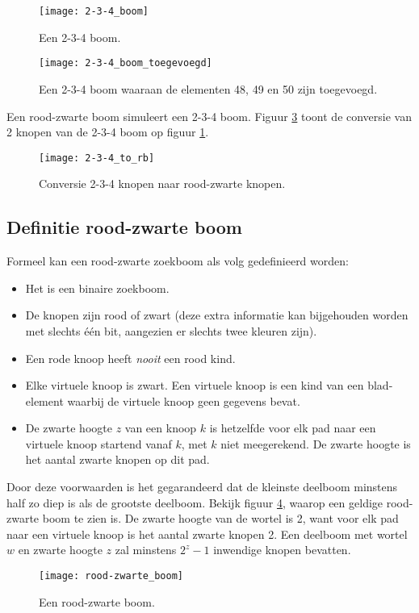 \documentclass{report}
\begin{document}
	\begin{figure}[h]
		\centering
		\texttt{[image: 2-3-4\_boom]}
		\caption{Een 2-3-4 boom.}
		\label{fig:2-3-4_boom}
	\end{figure}

	\begin{figure}[h]
		\centering
		\texttt{[image: 2-3-4\_boom\_toegevoegd]}
		\caption{Een 2-3-4 boom waaraan de elementen 48, 49 en 50 zijn toegevoegd.}
		\label{fig:2-3-4_boom_toegevoegd}
	\end{figure}

	Een rood-zwarte boom simuleert een 2-3-4 boom. Figuur \ref{fig:2-3-4_to_rb} toont de conversie van 2 knopen van de 2-3-4 boom op figuur \ref{fig:2-3-4_boom}.
	\begin{figure}[h]
		\centering
		\texttt{[image: 2-3-4\_to\_rb]}
		\caption{Conversie 2-3-4 knopen naar rood-zwarte knopen.}
		\label{fig:2-3-4_to_rb}
	\end{figure}
	
	\subsection{Definitie rood-zwarte boom}
	Formeel kan een rood-zwarte zoekboom als volg gedefinieerd worden:
	\begin{itemize}
		\item Het is een binaire zoekboom.
		\item De knopen zijn rood of zwart (deze extra informatie kan bijgehouden worden met slechts één bit, aangezien er slechts twee kleuren zijn).
		\item Een rode knoop heeft \textit{nooit} een rood kind.
		\item Elke virtuele knoop is zwart. Een virtuele knoop is een kind van een blad-element waarbij de virtuele knoop geen gegevens bevat.
		\item De zwarte hoogte $z$ van een knoop $k$ is hetzelfde voor elk pad naar een virtuele knoop startend vanaf $k$, met $k$ niet meegerekend. De zwarte hoogte is het aantal zwarte knopen op dit pad.
	\end{itemize}
	Door deze voorwaarden is het gegarandeerd dat de kleinste deelboom minstens half zo diep is als de grootste deelboom. Bekijk figuur \ref{fig:rood-zwarte_boom}, waarop een geldige rood-zwarte boom te zien is. De zwarte hoogte van de wortel is 2, want voor elk pad naar een virtuele knoop is het aantal zwarte knopen 2. Een deelboom met wortel $w$ en zwarte hoogte $z$ zal minstens $2^z - 1$ inwendige knopen bevatten.
	\begin{figure}[h]
		\centering
		\texttt{[image: rood-zwarte\_boom]}
		\caption{Een rood-zwarte boom.}
		\label{fig:rood-zwarte_boom}
	\end{figure}
	
\end{document}
